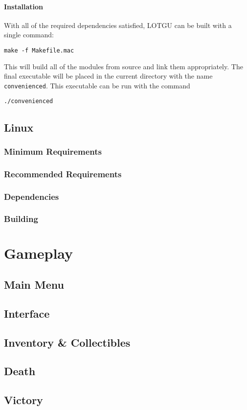 \documentclass{article}
\begin{document}
			\paragraph{Installation}
				With all of the required dependencies satisfied, LOTGU can be built with a single command:
				\begin{center}
					\colorbox{Gray!20}{\texttt{make -f Makefile.mac}}
				\end{center}
				This will build all of the modules from source and link them appropriately. The final executable will be placed in the current directory with the name \texttt{convenienced}. This executable can be run with the command
				\begin{center}
					\colorbox{Gray!20}{\texttt{./convenienced}}
				\end{center}
			
	\subsection{Linux}
		\subsubsection{Minimum Requirements}
		\subsubsection{Recommended Requirements}
		\subsubsection{Dependencies}
		\subsubsection{Building}
\section{Gameplay}
	\subsection{Main Menu}
	\subsection{Interface}
	\subsection{Inventory \& Collectibles}
	\subsection{Death}
	\subsection{Victory}
\end{document}
